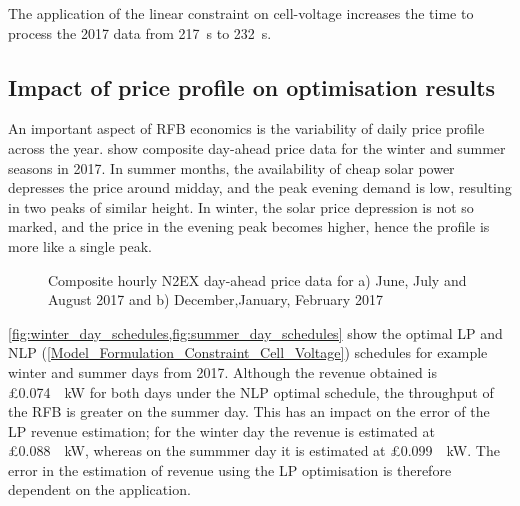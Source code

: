 \documentclass[preprint,3p,review,authoryear,10pt]{elsarticle}
\begin{document}
The application of the linear constraint on cell-voltage increases the time to process the 2017 data from \SI{217}{\second} to \SI{232}{\second}.
\subsection{Impact of price profile on optimisation results}
\label{Results_impact_of_price_profile}
An important aspect of RFB economics is the variability of daily price profile across the year.  show composite day-ahead price data for the winter and summer seasons in 2017. In summer months, the availability of cheap solar power depresses the price around midday, and the peak evening demand is low, resulting in two peaks of similar height. In winter, the solar price depression is not so marked, and the price in the evening peak becomes higher, hence the profile is more like a single peak.

\begin{figure}[!ht]
\centering
{}
\caption{Composite hourly N2EX day-ahead price data for a) June, July and August 2017 and b) December,January, February 2017}
\end{figure}


\cref{fig:winter_day_schedules,fig:summer_day_schedules} show the optimal LP and NLP (\cref{Model_Formulation_Constraint_Cell_Voltage}) schedules for example winter and summer days from 2017. Although the revenue obtained is \pounds \SI{0.074}{\per\kilo\watt} for both days under the NLP optimal schedule, the throughput of the RFB is greater on the summer day. This has an impact on the error of the LP revenue estimation; for the winter day the revenue is estimated at \pounds \SI{0.088}{\per\kilo\watt}, whereas on the summmer day it is estimated at \pounds \SI{0.099}{\per\kilo\watt}. The error in the estimation of revenue using the LP optimisation is therefore dependent on the application.
\end{document}
